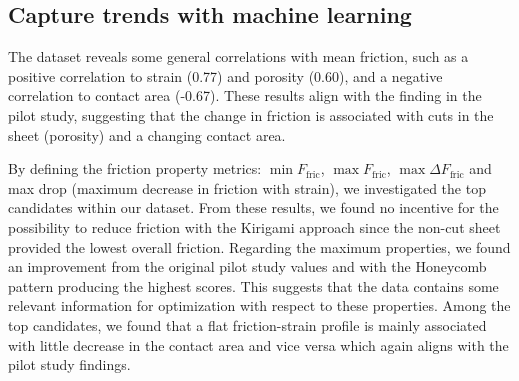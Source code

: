 



\subsection{Capture trends with machine learning}
The dataset reveals some general correlations with mean friction,
such as a positive correlation to strain (0.77)
and porosity (0.60), and a negative correlation to contact area (-0.67). These
results align with the finding in the pilot study, suggesting that the change in friction is associated with cuts in the sheet (porosity) and a changing contact area. 

By defining the friction property metrics: $\min F_{\text{fric}}$, $\max
F_{\text{fric}}$, $\max \Delta F_{\text{fric}}$ and max drop (maximum decrease in friction with strain), we investigated the top candidates within our dataset. From these results, we found no incentive for the possibility to reduce friction with the Kirigami approach since the non-cut sheet provided the lowest overall friction. Regarding the maximum
properties, we found an improvement from the original pilot study values and
with the Honeycomb pattern producing the highest scores. This suggests that the data contains some relevant information for optimization with respect to
these properties. Among the top candidates, we found that a flat friction-strain profile is mainly associated with little decrease in the
contact area and vice versa which again aligns with the pilot study findings.  

